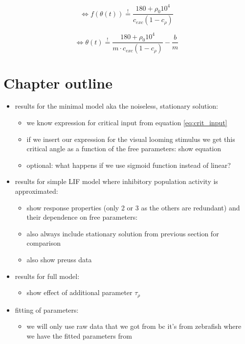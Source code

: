 \documentclass[a4paper,10pt,hidelinks]{scrreprt}
\begin{document}
	\begin{equation}
	\Leftrightarrow f(\theta(t)) \overset{!}{=} \frac{180 + \rho_{0}10^{4}} 
	{c_{exc}(1 - c_{\rho})}
	\end{equation}
	
	\begin{equation}
	\Leftrightarrow \theta(t) \overset{!}{=} \frac{180 + \rho_{0}10^{4}} 
	{m \cdot c_{exc}(1 - c_{\rho})} - \frac{b}{m}
	\end{equation}
	\section{Chapter outline}
	\begin{itemize}
		\item results for the minimal model aka the noiseless, stationary solution:
		\begin{itemize}
			\item we know expression for critical input from equation \ref{eq:crit_input}
			\item if we insert our expression for the visual looming stimulus we get this critical 
			angle as a function of the free parameters: show equation
			\item optional: what happens if we use sigmoid function instead of linear?
		\end{itemize}
		\item results for simple LIF model where inhibitory population activity is approximated:
		\begin{itemize}
			\item show response properties (only 2 or 3 as the others are redundant) and their 
			dependence on free parameters: 
			\item also always include stationary solution from previous section for comparison
			\item also show preuss data
		\end{itemize}
		\item results for full model:
		\begin{itemize}
			\item show effect of additional parameter $\tau_{\rho}$
		\end{itemize}
		\item fitting of parameters:
		\begin{itemize}
			\item we will only use raw data that we got from \cite{Bhattacharyya2017} bc it's from 
			zebrafish where we have the fitted parameters from \cite{Koyama2016}

\end{itemize}
\end{itemize}
\end{document}
